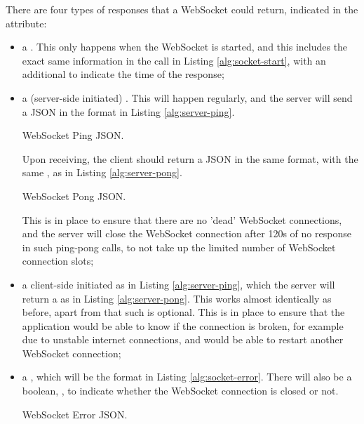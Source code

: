 There are four types of responses that a WebSocket could return, indicated in the  attribute:
\begin{itemize}
    \item a . This only happens when the WebSocket is started, and this includes the exact same information in the  call in Listing \ref{alg:socket-start}, with an additional  to indicate the time of the response;
    \item a (server-side initiated) . This will happen regularly, and the server will send a JSON in the format in Listing \ref{alg:server-ping}.
          \begin{listing}[!ht]
              \caption{WebSocket Ping JSON.}
              \label{alg:server-ping}
          \end{listing}

          Upon receiving, the client should return a  JSON in the same format, with the same , as in Listing \ref{alg:server-pong}.

          \begin{listing}[!ht]
              \caption{WebSocket Pong JSON.}
              \label{alg:server-pong}
          \end{listing}

          This is in place to ensure that there are no 'dead' WebSocket connections, and the server will close the WebSocket connection after 120s of no response in such ping-pong calls, to not take up the limited number of WebSocket connection slots;
    \item a client-side initiated  as in Listing \ref{alg:server-ping}, which the server will return a  as in Listing \ref{alg:server-pong}. This works almost identically as before, apart from that such  is optional. This is in place to ensure that the application would be able to know if the connection is broken, for example due to unstable internet connections, and would be able to restart another WebSocket connection;
    \item a , which will be the format in Listing \ref{alg:socket-error}. There will also be a boolean, , to indicate whether the WebSocket connection is closed or not.

          \begin{listing}[!ht]
              \caption{WebSocket Error JSON.}
              \label{alg:socket-error}
          \end{listing}


\end{itemize}

